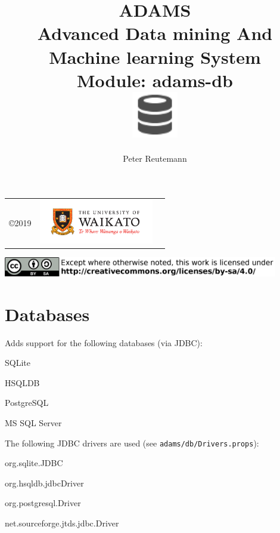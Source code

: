 \documentclass[a4paper]{book}
\title{
  \textbf{ADAMS} \\
  {\Large \textbf{A}dvanced \textbf{D}ata mining \textbf{A}nd \textbf{M}achine
  learning \textbf{S}ystem} \\
  {\Large Module: adams-db} \\
  \vspace{1cm}
  \includegraphics[width=2cm]{images/db-module.png} \\
}
\author{
  Peter Reutemann
}
\begin{document}
\begin{titlepage}
\maketitle

\thispagestyle{empty}
\center
\begin{table}[b]
	\begin{tabular}{c l l}
		\parbox[c][2cm]{2cm}{\copyright 2019} &
		\parbox[c][2cm]{5cm}{\includegraphics[width=5cm]{images/coat_of_arms.pdf}} \\
	\end{tabular}
	\includegraphics[width=12cm]{images/cc.png} \\
\end{table}

\end{titlepage}

\tableofcontents

\chapter{Databases}
Adds support for the following databases (via JDBC):
\begin{tight_itemize}
  \item SQLite\cite{sqlite}
  \item HSQLDB\cite{hsqldb}
  \item PostgreSQL\cite{postgresql}
  \item MS SQL Server\cite{mssql}
\end{tight_itemize}
The following JDBC drivers are used (see \texttt{adams/db/Drivers.props}):
\begin{tight_itemize}
  \item org.sqlite.JDBC
  \item org.hsqldb.jdbcDriver
  \item org.postgresql.Driver
  \item net.sourceforge.jtds.jdbc.Driver
\end{tight_itemize}



\end{document}
